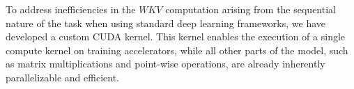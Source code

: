 \documentclass[11pt]{article}
\begin{document}


To address inefficiencies in the $WKV$ computation arising from the sequential nature of the task when using standard deep learning frameworks, we have developed a custom CUDA kernel.
This kernel enables the execution of a single compute kernel on training accelerators, while all other parts of the model, such as matrix multiplications and point-wise operations, are already inherently parallelizable and efficient. 



\end{document}
